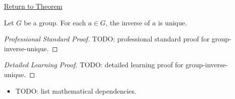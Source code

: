 \newpage
{}
\label{prf:group-inverse-unique}

\begin{remark*}[Return]
\hyperref[prop:group-inverse-unique]{Return to Theorem}
\end{remark*}

\begin{proposition*}
Let $G$ be a group. For each $a \in G$, the inverse of $a$ is unique.
\end{proposition*}

\begin{proof}[Professional Standard Proof]
\LRAProofBodyStart
TODO: professional standard proof for group-inverse-unique.
\end{proof}

\begin{proof}[Detailed Learning Proof]
\LRAProofBodyStart
TODO: detailed learning proof for group-inverse-unique.
\end{proof}

\begin{remark*}
\end{remark*}

\begin{dependencies}
\begin{itemize}
  \item TODO: list mathematical dependencies.
\end{itemize}
\end{dependencies}

\clearpage
